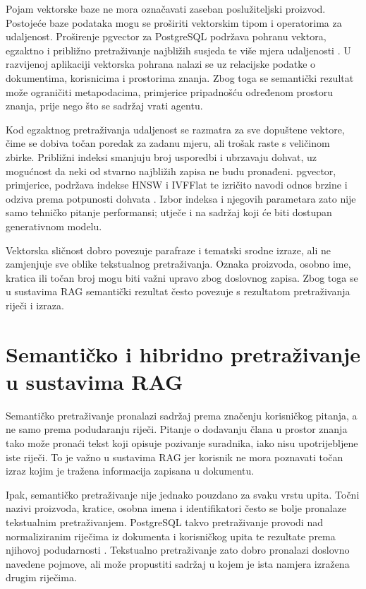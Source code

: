 Pojam vektorske baze ne mora označavati zaseban poslužiteljski proizvod. Postojeće baze podataka mogu se proširiti vektorskim tipom i operatorima za udaljenost. Proširenje pgvector za PostgreSQL podržava pohranu vektora, egzaktno i približno pretraživanje najbližih susjeda te više mjera udaljenosti \cite{pgvector}. U razvijenoj aplikaciji vektorska pohrana nalazi se uz relacijske podatke o dokumentima, korisnicima i prostorima znanja. Zbog toga se semantički rezultat može ograničiti metapodacima, primjerice pripadnošću određenom prostoru znanja, prije nego što se sadržaj vrati agentu.

Kod egzaktnog pretraživanja udaljenost se razmatra za sve dopuštene vektore, čime se dobiva točan poredak za zadanu mjeru, ali trošak raste s veličinom zbirke. Približni indeksi smanjuju broj usporedbi i ubrzavaju dohvat, uz mogućnost da neki od stvarno najbližih zapisa ne budu pronađeni. pgvector, primjerice, podržava indekse HNSW i IVFFlat te izričito navodi odnos brzine i odziva prema potpunosti dohvata \cite{pgvector}. Izbor indeksa i njegovih parametara zato nije samo tehničko pitanje performansi; utječe i na sadržaj koji će biti dostupan generativnom modelu.

Vektorska sličnost dobro povezuje parafraze i tematski srodne izraze, ali ne zamjenjuje sve oblike tekstualnog pretraživanja. Oznaka proizvoda, osobno ime, kratica ili točan broj mogu biti važni upravo zbog doslovnog zapisa. Zbog toga se u sustavima RAG semantički rezultat često povezuje s rezultatom pretraživanja riječi i izraza.

\section{Semantičko i hibridno pretraživanje u sustavima RAG}

Semantičko pretraživanje pronalazi sadržaj prema značenju korisničkog pitanja, a ne samo prema podudaranju riječi. Pitanje o dodavanju člana u prostor znanja tako može pronaći tekst koji opisuje pozivanje suradnika, iako nisu upotrijebljene iste riječi. To je važno u sustavima RAG jer korisnik ne mora poznavati točan izraz kojim je tražena informacija zapisana u dokumentu.

Ipak, semantičko pretraživanje nije jednako pouzdano za svaku vrstu upita. Točni nazivi proizvoda, kratice, osobna imena i identifikatori često se bolje pronalaze tekstualnim pretraživanjem. PostgreSQL takvo pretraživanje provodi nad normaliziranim riječima iz dokumenta i korisničkog upita te rezultate  prema njihovoj podudarnosti \cite{postgresqlTextSearch}. Tekstualno pretraživanje zato dobro pronalazi doslovno navedene pojmove, ali može propustiti sadržaj u kojem je ista namjera izražena drugim riječima.

